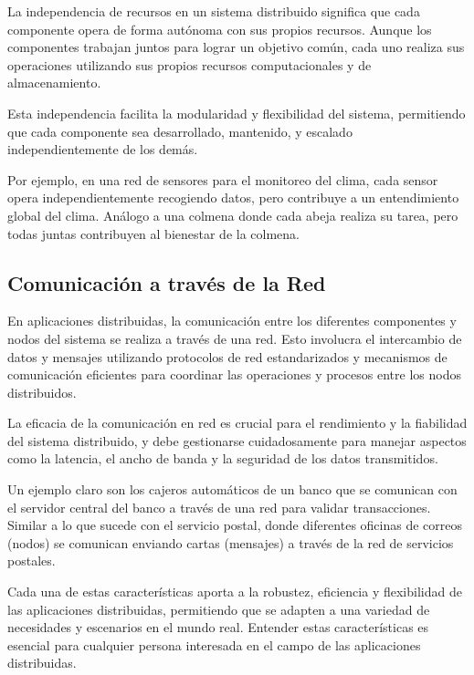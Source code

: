 La independencia de recursos en un sistema distribuido significa que cada componente opera de forma autónoma con sus propios recursos. Aunque los componentes trabajan juntos para lograr un objetivo común, cada uno realiza sus operaciones utilizando sus propios recursos computacionales y de almacenamiento.

Esta independencia facilita la modularidad y flexibilidad del sistema, permitiendo que cada componente sea desarrollado, mantenido, y escalado independientemente de los demás.

Por ejemplo, en una red de sensores para el monitoreo del clima, cada sensor opera independientemente recogiendo datos, pero contribuye a un entendimiento global del clima. Análogo a una colmena donde cada abeja realiza su tarea, pero todas juntas contribuyen al bienestar de la colmena.

\subsection{Comunicación a través de la Red}

En aplicaciones distribuidas, la comunicación entre los diferentes componentes y nodos del sistema se realiza a través de una red. Esto involucra el intercambio de datos y mensajes utilizando protocolos de red estandarizados y mecanismos de comunicación eficientes para coordinar las operaciones y procesos entre los nodos distribuidos.

La eficacia de la comunicación en red es crucial para el rendimiento y la fiabilidad del sistema distribuido, y debe gestionarse cuidadosamente para manejar aspectos como la latencia, el ancho de banda y la seguridad de los datos transmitidos.

Un ejemplo claro son los cajeros automáticos de un banco que se comunican con el servidor central del banco a través de una red para validar transacciones. Similar a lo que sucede con el servicio postal, donde diferentes oficinas de correos (nodos) se comunican enviando cartas (mensajes) a través de la red de servicios postales.

\begin{tcolorbox}[colback=yellow!10!white, colframe=blue!50!black, title=Resumiendo, coltitle=white]
	Cada una de estas características aporta a la robustez, eficiencia y flexibilidad de las aplicaciones distribuidas, permitiendo que se adapten a una variedad de necesidades y escenarios en el mundo real. Entender estas características es esencial para cualquier persona interesada en el campo de las aplicaciones distribuidas.
\end{tcolorbox}

